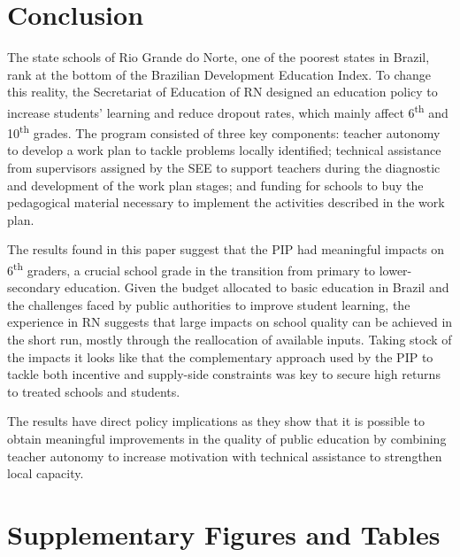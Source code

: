 \documentclass[11pt,a4paper]{article}
\begin{document}
	
	\section{Conclusion} \label{sec:conclude}
	
	The state schools of Rio Grande do Norte, one of the poorest states in Brazil, rank at the bottom of the Brazilian Development Education Index. To change this reality, the Secretariat of Education of RN designed an education policy to increase students' learning and reduce dropout rates, which mainly affect 6\textsuperscript{th} and 10\textsuperscript{th} grades. The program consisted of three key components: teacher autonomy to develop a work plan to tackle problems locally identified; technical assistance from supervisors assigned by the SEE to support teachers during the diagnostic and development of the work plan stages; and funding for schools to buy the pedagogical material necessary to implement the activities described in the work plan. 
	
	The results found in this paper suggest that the PIP had meaningful impacts on 6\textsuperscript{th} graders, a crucial school grade in the transition from primary to lower-secondary education. Given the budget allocated to basic education in Brazil and the challenges faced by public authorities to improve student learning, the experience in RN suggests that large impacts on school quality can be achieved in the short run, mostly through the reallocation of available inputs. Taking stock of the impacts it looks like that the complementary approach used by the PIP to tackle both incentive and supply-side constraints was key to secure high returns to treated schools and students. 
	
	The results have direct policy implications as they show that it is possible to obtain meaningful improvements in the quality of public education by combining teacher autonomy to increase motivation with technical assistance to strengthen local capacity. 
	
	
	
	
	\clearpage
	
	
	\clearpage
	\appendix
	
	\section{Supplementary Figures and Tables}
	\setcounter{figure}{0}
	\setcounter{table}{0}
	\renewcommand{\thefigure}{A\arabic{figure}}
	\renewcommand{\thetable}{A\arabic{table}}
	\label{app:tables_figures}
	
\end{document}
